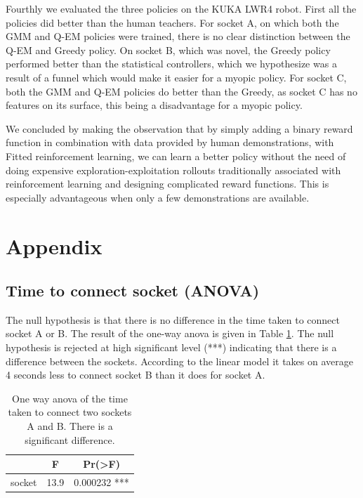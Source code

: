 Fourthly we evaluated the three policies on the KUKA LWR4 robot. First all the policies did better than the human 
teachers. For socket A, on which both the GMM and Q-EM policies were trained, there is no clear distinction between 
the Q-EM and Greedy policy. On socket B, which was novel, the Greedy policy performed better than the statistical controllers, 
which we hypothesize was a result of a funnel which would make it easier for a myopic policy. For socket C, both the 
GMM and Q-EM policies do better than the Greedy, as socket C has no features on its surface, this being a disadvantage 
for a myopic policy.

We concluded by making the observation that by simply adding a binary reward function in combination with 
data provided by human demonstrations, with Fitted reinforcement learning, we can learn a better policy without 
the need of doing expensive exploration-exploitation  rollouts traditionally associated with reinforcement learning and 
designing complicated reward functions. This is especially advantageous when only a few demonstrations are available.

\FloatBarrier
\section{Appendix}

\subsection{Time to connect socket (ANOVA)}
\label{app:anova_socket}

The null hypothesis is that there is no difference in 
the time taken to connect socket A or B. The result of the one-way anova
is given in Table \ref{tab:ch4:anova_socket}. The null hypothesis is rejected at high significant level (***)
indicating that there is a difference between the sockets. According to the linear 
model it takes on average 4 seconds less to connect socket B than it does for socket A.

\begin{table}[h]
\centering
\begin{tabular}{lcc}
  \hline
          &   F    & Pr(>F)  	     \\ \hline
   socket & 13.9   &  0.000232 *** 
\end{tabular}
\caption{One way anova of the time taken to connect two sockets A and B. There is a significant difference.}
\label{tab:ch4:anova_socket}
\end{table}

